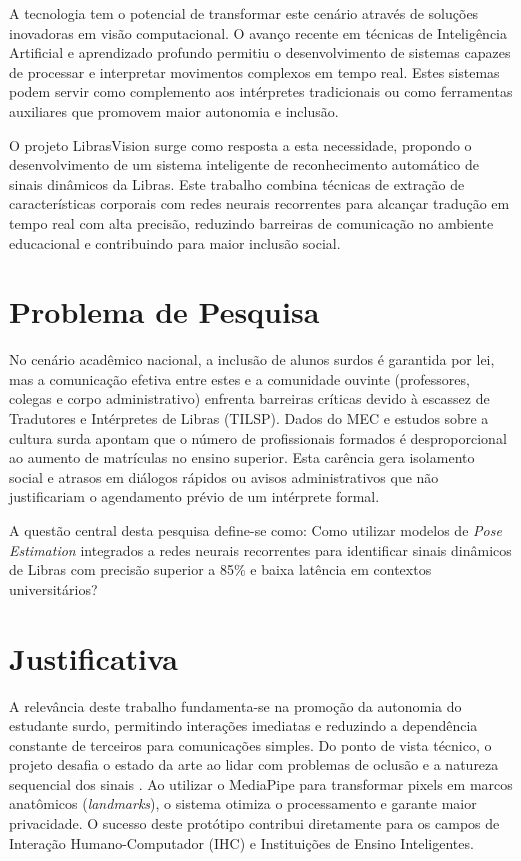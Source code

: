 A tecnologia tem o potencial de transformar este cenário através de soluções inovadoras em visão computacional. O avanço recente em técnicas de Inteligência Artificial e aprendizado profundo permitiu o desenvolvimento de sistemas capazes de processar e interpretar movimentos complexos em tempo real. Estes sistemas podem servir como complemento aos intérpretes tradicionais ou como ferramentas auxiliares que promovem maior autonomia e inclusão.

O projeto LibrasVision surge como resposta a esta necessidade, propondo o desenvolvimento de um sistema inteligente de reconhecimento automático de sinais dinâmicos da Libras. Este trabalho combina técnicas de extração de características corporais com redes neurais recorrentes para alcançar tradução em tempo real com alta precisão, reduzindo barreiras de comunicação no ambiente educacional e contribuindo para maior inclusão social.

\section{Problema de Pesquisa}

No cenário acadêmico nacional, a inclusão de alunos surdos é garantida por lei, mas a comunicação efetiva entre estes e a comunidade ouvinte (professores, colegas e corpo administrativo) enfrenta barreiras críticas devido à escassez de Tradutores e Intérpretes de Libras (TILSP). Dados do MEC e estudos sobre a cultura surda \cite{dockens:18} apontam que o número de profissionais formados é desproporcional ao aumento de matrículas no ensino superior. Esta carência gera isolamento social e atrasos em diálogos rápidos ou avisos administrativos que não justificariam o agendamento prévio de um intérprete formal.

A questão central desta pesquisa define-se como: Como utilizar modelos de \textit{Pose Estimation} integrados a redes neurais recorrentes para identificar sinais dinâmicos de Libras com precisão superior a 85\% e baixa latência em contextos universitários?

\section{Justificativa}

A relevância deste trabalho fundamenta-se na promoção da autonomia do estudante surdo, permitindo interações imediatas e reduzindo a dependência constante de terceiros para comunicações simples. Do ponto de vista técnico, o projeto desafia o estado da arte ao lidar com problemas de oclusão e a natureza sequencial dos sinais \cite{attili:24, jain:24}. Ao utilizar o MediaPipe para transformar pixels em marcos anatômicos (\textit{landmarks}), o sistema otimiza o processamento e garante maior privacidade. O sucesso deste protótipo contribui diretamente para os campos de Interação Humano-Computador (IHC) e Instituições de Ensino Inteligentes.

